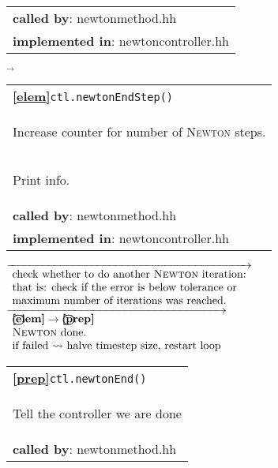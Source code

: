 \begin{landscape}
{\begin{tabular}{|l|}
      \textbf{called by}: newtonmethod.hh\\ 
      \textbf{implemented in}: newtoncontroller.hh\\ 
	\hline 
  \end{tabular}
\nextline
    {\scriptsize$\overrightarrow{}
    $}
   \begin{tabular}{|l|} 
      \hline 
      \textbf{\textcircled{\ref{elem}}}\verb+ctl.newtonEndStep()+\\ 
      \begin{scriptsize}Increase counter for number of \textsc{Newton} steps. \end{scriptsize}\\
      \begin{scriptsize}Print info. \end{scriptsize}\\
      \textbf{called by}: newtonmethod.hh\\ 
      \textbf{implemented in}: newtoncontroller.hh\\ 
	\hline 
  \end{tabular}
    {\scriptsize$\overrightarrow
				  {\begin{array}{l}
				  \textnormal{check whether to do another \textsc{Newton} iteration:}\\
				  \textnormal{that is: check if the error is below tolerance or}\\
                                  \textnormal{maximum number of iterations was reached.}\\
                                \end{array}}
    $}
    {\scriptsize$\overrightarrow{\begin{array}{l}
				  \textbf{\textcircled{\ref{elem}}}\rightarrow\textbf{\textcircled{\ref{prep}}}\\
				  \textnormal{\textsc{Newton} done.}\\
				  \textnormal{if failed $\rightsquigarrow$ halve timestep size, restart loop}
                                \end{array}
    }$}
\nextline
    \begin{tabular}{|l|}
      \hline
      \textbf{\textcircled{\ref{prep}}}\verb+ctl.newtonEnd()+ \\
      \begin{scriptsize}Tell the controller we are done\end{scriptsize}\\      
      \textbf{called by}: newtonmethod.hh\\

\end{tabular}}
\end{landscape}
